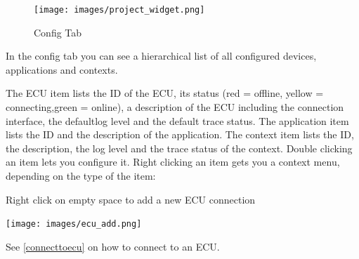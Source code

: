 \documentclass[a4paper,11pt]{article}
\begin{document}
\begin{figure}[H]
 \centering
 \texttt{[image: images/project\_widget.png]}
 \caption{Config Tab}
 \label{fig:configtab}
\end{figure}


In the config tab you can see a hierarchical list of all configured devices, applications and contexts.

The ECU item lists the ID of the ECU, its status (red = offline, yellow = connecting,green = online), a description of the ECU including the connection interface, the defaultlog level and the default trace status.\linebreak
The application item lists the ID and the description of the application.\linebreak
The context item lists the ID, the description, the log level and the trace status of the context.
Double clicking an item lets you configure it. Right clicking an item gets you a context menu, depending on the type of the item:\linebreak

\vspace{0.3cm}

Right click on empty space to add a new ECU connection\linebreak

\vspace{0.1cm}

\texttt{[image: images/ecu\_add.png]}\linebreak

\vspace{0.1cm} See \autoref{connecttoecu} on how to connect to an ECU.\linebreak
\end{document}
